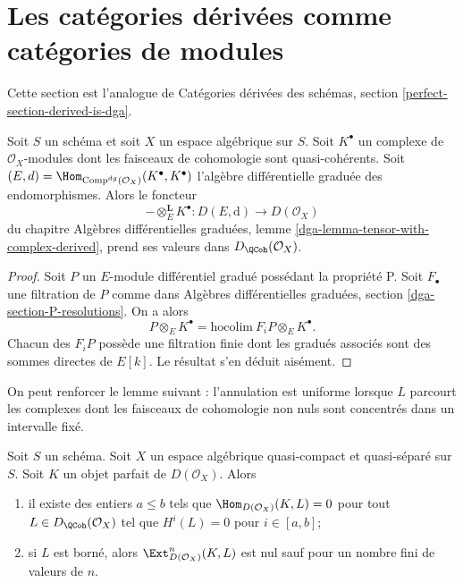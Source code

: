 \section{Les cat\'egories d\'eriv\'ees comme cat\'egories de modules}
\label{section-derived-is-dga}

\noindent
Cette section est l'analogue de Cat\'egories d\'eriv\'ees des sch\'emas,
section \ref{perfect-section-derived-is-dga}.

\begin{lemma}
\label{lemma-tensor-with-QCoh-complex}
Soit $S$ un sch\'ema et soit $X$ un espace alg\'ebrique sur $S$. Soit
$K^\bullet$ un complexe de $\mathcal{O}_X$-modules dont les faisceaux de
cohomologie sont quasi-coh\'erents. Soit
$(E,d)=\Hom_{\text{Comp}^{dg}(\mathcal{O}_X)}(K^\bullet,K^\bullet)$ l'alg\`ebre
diff\'erentielle gradu\'ee des endomorphismes. Alors le foncteur
$$
- \otimes_E^\mathbf{L} K^\bullet :
D(E, \text{d}) \longrightarrow D(\mathcal{O}_X)
$$
du chapitre Alg\`ebres diff\'erentielles gradu\'ees, lemme
\ref{dga-lemma-tensor-with-complex-derived}, prend ses valeurs dans
$D_\QCoh(\mathcal{O}_X)$.
\end{lemma}

\begin{proof}
Soit $P$ un $E$-module diff\'erentiel gradu\'e poss\'edant la propri\'et\'e P.
Soit $F_\bullet$ une filtration de $P$ comme dans Alg\`ebres diff\'erentielles
gradu\'ees, section \ref{dga-section-P-resolutions}. On a alors
$$
P \otimes_E K^\bullet = \text{hocolim}\ F_iP \otimes_E K^\bullet.
$$
Chacun des $F_iP$ poss\`ede une filtration finie dont les gradu\'es associ\'es
sont des sommes directes de $E[k]$. Le r\'esultat s'en d\'eduit ais\'ement.
\end{proof}

\noindent
On peut renforcer le lemme suivant : l'annulation est uniforme lorsque $L$
parcourt les complexes dont les faisceaux de cohomologie non nuls sont
concentr\'es dans un intervalle fix\'e.

\begin{lemma}
\label{lemma-ext-from-perfect-into-bounded-QCoh}
Soit $S$ un sch\'ema. Soit $X$ un espace alg\'ebrique quasi-compact et
quasi-s\'epar\'e sur $S$. Soit $K$ un objet parfait de
$D(\mathcal{O}_X)$. Alors
\begin{enumerate}
\item il existe des entiers $a\leq b$ tels que
$\Hom_{D(\mathcal{O}_X)}(K,L)=0$ pour tout
$L\in D_\QCoh(\mathcal{O}_X)$ tel que $H^i(L)=0$ pour $i\in[a,b]$;
\item si $L$ est born\'e, alors
$\Ext^n_{D(\mathcal{O}_X)}(K,L)$ est nul sauf pour un nombre fini de valeurs de
$n$.
\end{enumerate}
\end{lemma}

